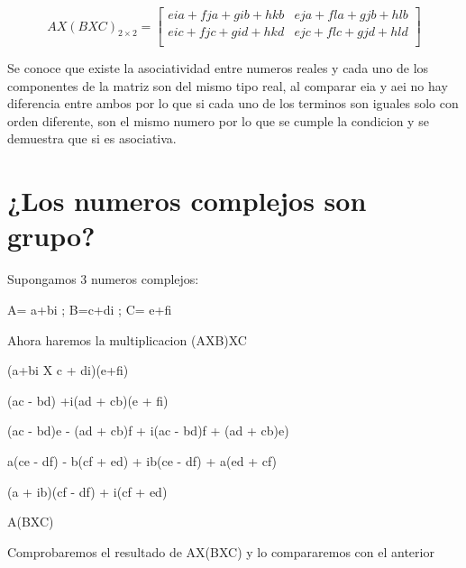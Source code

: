 \documentclass{article}
\begin{document}
\[
AX(BXC)_{2\times 2} =
  \left[ {\begin{array}{cc}
    eia + fja + gib + hkb & eja + fla +gjb + hlb\\
    eic + fjc + gid + hkd & ejc + flc +gjd+ hld\\
  
  \end{array} } \right]
\]

Se conoce que existe la asociatividad entre numeros reales y cada uno de los componentes de la matriz son del mismo tipo real, al comparar eia y aei no hay diferencia entre ambos por lo que si cada uno de los terminos son iguales solo con orden diferente, son el mismo numero por lo que se cumple la condicion y se demuestra que si es asociativa.


\section{¿Los numeros complejos son grupo?}
\begin{flushleft}Supongamos 3 numeros complejos:\end{flushleft}


{%
\centering A= a+bi ; B=c+di  ; C= e+fi
\par
}

\begin{flushleft}Ahora haremos la multiplicacion (AXB)XC\end{flushleft}

{%
\centering (a+bi X c + di)(e+fi)

{(ac - bd) +i(ad + cb)}(e + fi)

{(ac - bd)e - (ad + cb)f} + i{(ac - bd)f} + (ad + cb)e)

{a(ce - df) - b(cf + ed)} + i{b(ce - df)} + a(ed + cf)

(a + ib){(cf - df) + i(cf + ed)}

A(BXC)
\par
}

\begin{flushleft}Comprobaremos el resultado de  AX(BXC) y lo compararemos con el anterior\end{flushleft}
\end{document}
